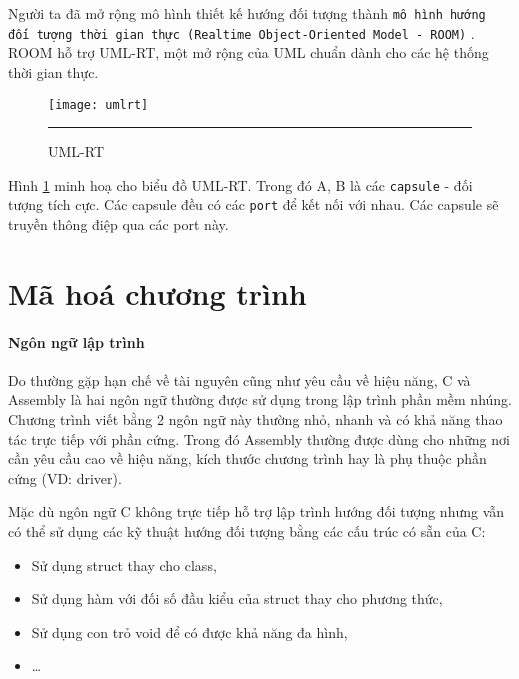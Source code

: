                 Người ta đã mở rộng mô hình thiết kế hướng đối tượng thành \texttt{mô
                hình hướng đối tượng thời gian thực (Realtime Object-Oriented
                Model - ROOM)} \cite{ROOM}. ROOM hỗ trợ UML-RT, một mở rộng của
                UML chuẩn dành cho các hệ thống thời gian thực. 

                \begin{figure}[H]
                    \centering
                    \texttt{[image: umlrt]}
                    \rule{35em}{0.5pt}
                    \caption{UML-RT}
                    \label{fig:umlrt}
                \end{figure}

                Hình \ref{fig:umlrt} minh hoạ cho biểu đồ UML-RT. Trong đó A, B
                là các \texttt{capsule} - đối tượng tích cực. Các capsule đều
                có các \texttt{port} để kết nối với nhau. Các capsule sẽ truyền
                thông điệp qua các port này.
                
    \section{Mã hoá chương trình}
        \paragraph{Ngôn ngữ lập trình}
            Do thường gặp hạn chế về tài nguyên cũng như yêu cầu về hiệu năng,
            C và Assembly là hai ngôn ngữ thường được sử dụng trong lập trình
            phần mềm nhúng. Chương trình viết bằng 2 ngôn ngữ này thường nhỏ,
            nhanh và có khả năng thao tác trực tiếp với phần cứng. Trong đó
            Assembly thường được dùng cho những nơi cần yêu cầu cao về hiệu
            năng, kích thước chương trình hay là phụ thuộc phần cứng (VD:
            driver).

            Mặc dù ngôn ngữ C không trực tiếp hỗ trợ lập trình hướng đối tượng
            nhưng vẫn có thể sử dụng các kỹ thuật hướng đối tượng bằng các cấu
            trúc có sẵn của C:
            \begin{itemize}
                \item Sử dụng struct thay cho class,
                \item Sử dụng hàm với đối số đầu kiểu của struct thay
                    cho phương thức,
                \item Sử dụng con trỏ void để có được khả năng đa hình,
                \item \ldots
            \end{itemize}


